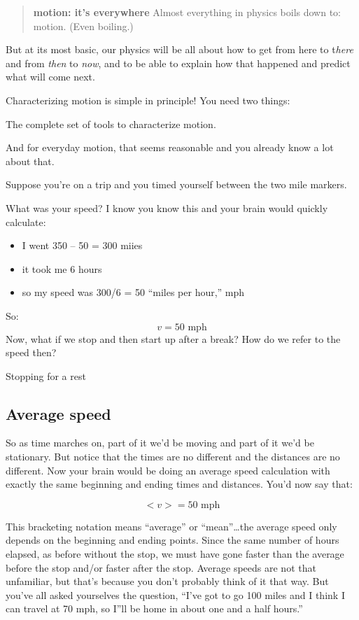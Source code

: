 \documentclass[
  letterpaper,
  DIV=11,
  numbers=noendperiod,
  oneside]{scrreprt}
\providecommand{\tightlist}{%
  \setlength{\itemsep}{0pt}\setlength{\parskip}{0pt}}\usepackage{longtable,booktabs,array}
\begin{document}
\begin{quote}
\textbf{motion: it's everywhere} Almost everything in physics boils down
to: motion. (Even boiling.)
\end{quote}

But at its most basic, our physics will be all about how to get from
here to t\emph{here} and from \emph{then} to \emph{now}, and to be able
to explain how that happened and predict what will come next.

Characterizing motion is simple in principle! You need two things:

The complete set of tools to characterize motion.

And for everyday motion, that seems reasonable and you already know a
lot about that.

Suppose you're on a trip and you timed yourself between the two mile
markers.

What was your speed? I know you know this and your brain would quickly
calculate:

\begin{itemize}
\tightlist
\item
  I went 350 -- 50 = 300 miies
\item
  it took me 6 hours
\item
  so my speed was 300/6 = 50 ``miles per hour,'' mph
\end{itemize}

So: \[
v=50 \text{ mph}
\] Now, what if we stop and then start up after a break? How do we refer
to the speed then?

Stopping for a rest

\subsection{Average speed}\label{sec-averagespeed}

So as time marches on, part of it we'd be moving and part of it we'd be
stationary. But notice that the times are no different and the distances
are no different. Now your brain would be doing an average speed
calculation with exactly the same beginning and ending times and
distances. You'd now say that:

\[
<v> = 50 \text{ mph}
\]

This bracketing notation means ``average'' or ``mean''\ldots the average
speed only depends on the beginning and ending points. Since the same
number of hours elapsed, as before without the stop, we must have gone
faster than the average before the stop and/or faster after the stop.
Average speeds are not that unfamiliar, but that's because you don't
probably think of it that way. But you've all asked yourselves the
question, ``I've got to go 100 miles and I think I can travel at 70 mph,
so I''ll be home in about one and a half hours.''
\end{document}
